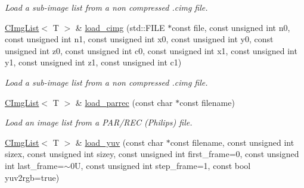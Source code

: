\begin{DoxyCompactItemize}
\begin{DoxyCompactList}\small\item\em Load a sub-\/image list from a non compressed .cimg file. \item\end{DoxyCompactList}\item 
\hypertarget{structcimg__library_1_1CImgList_add83dfb712666f092f5a222d6a55e400}{
\hyperlink{structcimg__library_1_1CImgList}{CImgList}$<$ T $>$ \& \hyperlink{structcimg__library_1_1CImgList_add83dfb712666f092f5a222d6a55e400}{load\_\-cimg} (std::FILE $\ast$const file, const unsigned int n0, const unsigned int n1, const unsigned int x0, const unsigned int y0, const unsigned int z0, const unsigned int c0, const unsigned int x1, const unsigned int y1, const unsigned int z1, const unsigned int c1)}
\label{structcimg__library_1_1CImgList_add83dfb712666f092f5a222d6a55e400}

\begin{DoxyCompactList}\small\item\em Load a sub-\/image list from a non compressed .cimg file. \item\end{DoxyCompactList}\item 
\hypertarget{structcimg__library_1_1CImgList_a4991be1e15f3c49a4fa24870bd67d09b}{
\hyperlink{structcimg__library_1_1CImgList}{CImgList}$<$ T $>$ \& \hyperlink{structcimg__library_1_1CImgList_a4991be1e15f3c49a4fa24870bd67d09b}{load\_\-parrec} (const char $\ast$const filename)}
\label{structcimg__library_1_1CImgList_a4991be1e15f3c49a4fa24870bd67d09b}

\begin{DoxyCompactList}\small\item\em Load an image list from a PAR/REC (Philips) file. \item\end{DoxyCompactList}\item 
\hypertarget{structcimg__library_1_1CImgList_af796089a71cdfa15360c7bb6dd36b762}{
\hyperlink{structcimg__library_1_1CImgList}{CImgList}$<$ T $>$ \& \hyperlink{structcimg__library_1_1CImgList_af796089a71cdfa15360c7bb6dd36b762}{load\_\-yuv} (const char $\ast$const filename, const unsigned int sizex, const unsigned int sizey, const unsigned int first\_\-frame=0, const unsigned int last\_\-frame=$\sim$0U, const unsigned int step\_\-frame=1, const bool yuv2rgb=true)}
\label{structcimg__library_1_1CImgList_af796089a71cdfa15360c7bb6dd36b762}


\end{DoxyCompactItemize}
